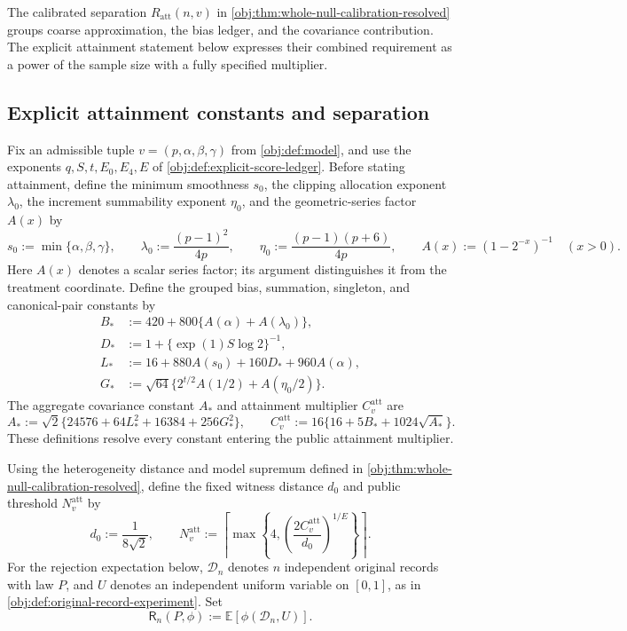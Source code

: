 The calibrated separation \(R_{\mathrm{att}}(n,v)\) in \cref{obj:thm:whole-null-calibration-resolved} groups coarse approximation, the bias ledger, and the covariance contribution. The explicit attainment statement below expresses their combined requirement as a power of the sample size with a fully specified multiplier.

\subsection{Explicit attainment constants and separation}

Fix an admissible tuple \(v=(p,\alpha,\beta,\gamma)\) from \cref{obj:def:model}, and use the exponents \(q,S,t,E_0,E_4,E\) of \cref{obj:def:explicit-score-ledger}. Before stating attainment, define the minimum smoothness \(s_0\), the clipping allocation exponent \(\lambda_0\), the increment summability exponent \(\eta_0\), and the geometric-series factor \(A(x)\) by
\[
s_0:=\min\{\alpha,\beta,\gamma\},
\qquad
\lambda_0:=\frac{(p-1)^2}{4p},
\qquad
\eta_0:=\frac{(p-1)(p+6)}{4p},
\qquad
A(x):=(1-2^{-x})^{-1}\quad(x>0).
\]
Here \(A(x)\) denotes a scalar series factor; its argument distinguishes it from the treatment coordinate. Define the grouped bias, summation, singleton, and canonical-pair constants by
\[
\begin{aligned}
B_*&:=420+800\{A(\alpha)+A(\lambda_0)\},\\
D_*&:=1+\{\exp(1)S\log 2\}^{-1},\\
L_*&:=16+880A(s_0)+160D_*+960A(\alpha),\\
G_*&:=\sqrt{64}\{2^{t/2}A(1/2)+A(\eta_0/2)\}.
\end{aligned}
\]
The aggregate covariance constant \(A_*\) and attainment multiplier \(C^{\mathrm{att}}_v\) are
\[
A_*:=\sqrt{2}\{24576+64L_*^2+16384+256G_*^2\},
\qquad
C^{\mathrm{att}}_v:=16\{16+5B_*+1024\sqrt{A_*}\}.
\]
These definitions resolve every constant entering the public attainment multiplier.

Using the heterogeneity distance and model supremum defined in \cref{obj:thm:whole-null-calibration-resolved}, define the fixed witness distance \(d_0\) and public threshold \(N^{\mathrm{att}}_v\) by
\[
d_0:=\frac{1}{8\sqrt{2}},
\qquad
N^{\mathrm{att}}_v
:=\left\lceil\max\left\{4,
\left(\frac{2C^{\mathrm{att}}_v}{d_0}\right)^{1/E}\right\}\right\rceil.
\]
For the rejection expectation below, \(\mathcal D_n\) denotes \(n\) independent original records with law \(P\), and \(U\) denotes an independent uniform variable on \([0,1]\), as in \cref{obj:def:original-record-experiment}. Set
\[
\mathsf R_n(P,\phi):=\mathbb E[\phi(\mathcal D_n,U)].
\]

